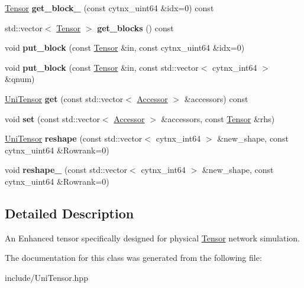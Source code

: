 \begin{DoxyCompactItemize}
\item 
\mbox{\label{classcytnx_1_1UniTensor_a216d54f936554fa11b1edaff968d69d4}} 
\hyperlink{classcytnx_1_1Tensor}{Tensor} {\bfseries get\+\_\+block\+\_\+} (const cytnx\+\_\+uint64 \&idx=0) const
\item 
\mbox{\label{classcytnx_1_1UniTensor_a661bc7073dc51b16a4b9802bbcc3cba2}} 
std\+::vector$<$ \hyperlink{classcytnx_1_1Tensor}{Tensor} $>$ {\bfseries get\+\_\+blocks} () const
\item 
\mbox{\label{classcytnx_1_1UniTensor_abcd3008bf05771f0623ce1ef80b1085a}} 
void {\bfseries put\+\_\+block} (const \hyperlink{classcytnx_1_1Tensor}{Tensor} \&in, const cytnx\+\_\+uint64 \&idx=0)
\item 
\mbox{\label{classcytnx_1_1UniTensor_a9bf19662043d456a89a8e51215c67beb}} 
void {\bfseries put\+\_\+block} (const \hyperlink{classcytnx_1_1Tensor}{Tensor} \&in, const std\+::vector$<$ cytnx\+\_\+int64 $>$ \&qnum)
\item 
\mbox{\label{classcytnx_1_1UniTensor_a2e2d7f3137bb1cfb26e6a19acbc9563e}} 
\hyperlink{classcytnx_1_1UniTensor}{Uni\+Tensor} {\bfseries get} (const std\+::vector$<$ \hyperlink{classcytnx_1_1Accessor}{Accessor} $>$ \&accessors) const
\item 
\mbox{\label{classcytnx_1_1UniTensor_a90ba42a96ac324dfea7436d383fecc79}} 
void {\bfseries set} (const std\+::vector$<$ \hyperlink{classcytnx_1_1Accessor}{Accessor} $>$ \&accessors, const \hyperlink{classcytnx_1_1Tensor}{Tensor} \&rhs)
\item 
\mbox{\label{classcytnx_1_1UniTensor_a6c749dc601952c239225903371ddb669}} 
\hyperlink{classcytnx_1_1UniTensor}{Uni\+Tensor} {\bfseries reshape} (const std\+::vector$<$ cytnx\+\_\+int64 $>$ \&new\+\_\+shape, const cytnx\+\_\+uint64 \&Rowrank=0)
\item 
\mbox{\label{classcytnx_1_1UniTensor_aa1047de2e99ac2abd79ff4f74145d543}} 
void {\bfseries reshape\+\_\+} (const std\+::vector$<$ cytnx\+\_\+int64 $>$ \&new\+\_\+shape, const cytnx\+\_\+uint64 \&Rowrank=0)
\end{DoxyCompactItemize}


\subsection{Detailed Description}
An Enhanced tensor specifically designed for physical \hyperlink{classcytnx_1_1Tensor}{Tensor} network simulation. 

The documentation for this class was generated from the following file\+:\begin{DoxyCompactItemize}
\item 
include/Uni\+Tensor.\+hpp\end{DoxyCompactItemize}
